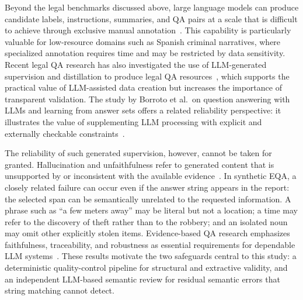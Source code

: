 \documentclass[graybox]{SNmult}
\begin{document}
Beyond the legal benchmarks discussed above, large language models can produce
candidate labels, instructions, summaries, and QA pairs at a scale that is
difficult to achieve through exclusive manual annotation~\cite{zhou2017neuralqg,sun2018answerfocused}. This capability is
particularly valuable for low-resource domains such as Spanish criminal
narratives, where specialized annotation requires time and may be restricted by
data sensitivity. Recent legal QA research has also investigated the use of
LLM-generated supervision and distillation to produce legal QA
resources~\cite{italiani2025aceattorney}, which supports the practical value of
LLM-assisted data creation but increases the importance of transparent
validation. The study by Borroto et al.\ on question answering with LLMs and
learning from answer sets offers a related reliability perspective: it
illustrates the value of supplementing LLM processing with explicit and
externally checkable constraints~\cite{borroto2025llm2las}.


The reliability of such generated supervision, however, cannot be taken for
granted. Hallucination and unfaithfulness refer to generated content that is unsupported
by or inconsistent with the available evidence~\cite{ji2023hallucination,zhang2023siren}.
In synthetic EQA, a closely related failure can occur even if the answer string
appears in the report: the selected span can be semantically unrelated to the
requested information. A phrase such as ``a few meters away'' may be literal
but not a location; a time may refer to the discovery of theft rather than to
the robbery; and an isolated noun may omit other explicitly stolen items.
Evidence-based QA research emphasizes faithfulness, traceability, and
robustness as essential requirements for dependable LLM
systems~\cite{schimanski2024faithful}. These results motivate the two safeguards
central to this study: a deterministic quality-control pipeline for structural
and extractive validity, and an independent LLM-based semantic review for
residual semantic errors that string matching cannot detect.

\end{document}
